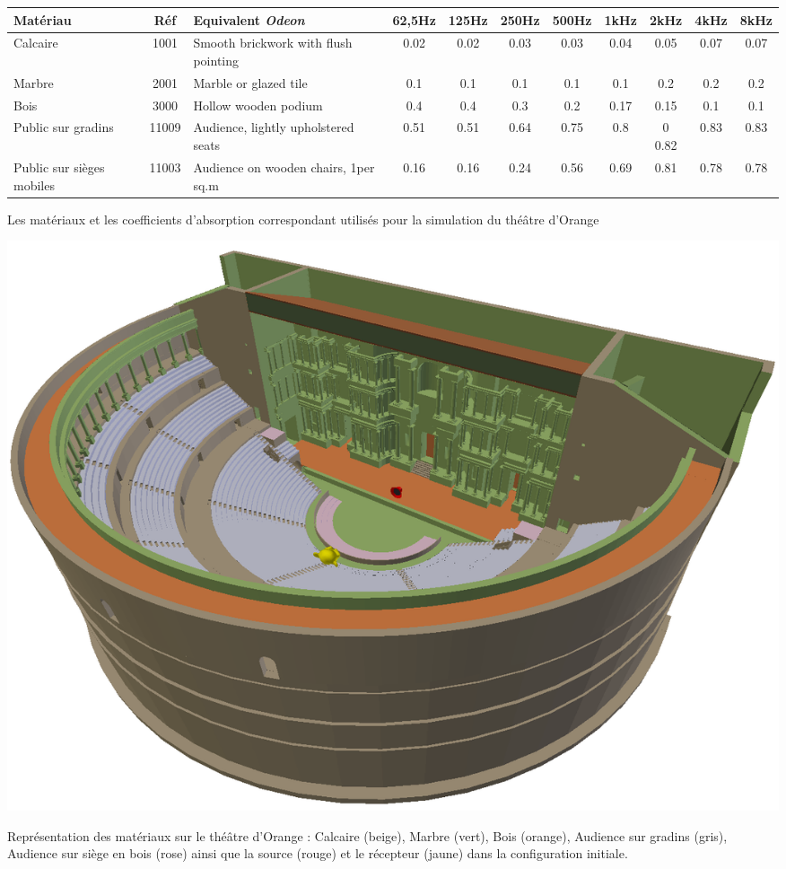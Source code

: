 \begin{tableth} 
\footnotesize
	\begin{tabular}{| m{1.5cm} | c | m{1.7cm} | *{8}{c|}}
		\hline
		Matériau &Réf & Equivalent \textit{Odeon} & 62,5Hz & 125Hz & 250Hz & 500Hz & 1kHz & 2kHz & 4kHz & 8kHz \\
		  \hline
		  \hline
		   Calcaire & 1001 & Smooth brickwork with flush pointing\footnotemark & 0.02&	0.02&	0.03&	0.03&	0.04&	0.05&	0.07&	0.07 \\
		   \hline
		Marbre &2001 & Marble or glazed tile\footnotemark & 0.1 & 0.1 & 0.1 & 0.1 & 0.1 & 0.2 & 0.2 & 0.2 \\
		   \hline
		Bois & 3000 & Hollow wooden podium\footnotemark & 0.4&0.4&0.3&	0.2&	0.17& 0.15& 0.1&	0.1 \\
		   \hline
		Public sur gradins & 11009 & Audience, lightly upholstered seats\footnotemark & 0.51&	0.51&	0.64&	0.75&	0.8&0	0.82&	0.83&	0.83 \\
	     \hline
	     	Public sur sièges mobiles & 11003 & Audience on wooden chairs, 1per sq.m\footnotemark & 0.16 & 0.16 & 0.24 & 0.56 & 0.69 & 0.81 & 0.78 & 0.78 \\
	     \hline

	 \end{tabular}
	\caption{Les matériaux et les coefficients d'absorption correspondant utilisés pour la simulation du théâtre d'Orange}
	\label{matOdeon}
\end{tableth}
\addtocounter{footnote}{-1}
\addtocounter{footnote}{-1}
\addtocounter{footnote}{-1}
\addtocounter{footnote}{1}
\addtocounter{footnote}{1}

\begin{figureth}
	\includegraphics[width=\linewidth]{images/theatreMat}
	\caption{Représentation des matériaux sur le théâtre d'Orange : Calcaire (beige), Marbre (vert), Bois (orange), Audience sur gradins (gris), Audience sur siège en bois (rose) ainsi que la source (rouge) et le récepteur (jaune) dans la configuration initiale.}
	\label{theatreMat}
\end{figureth}

